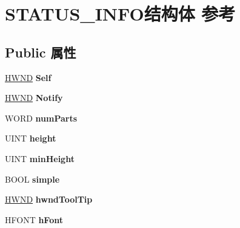 \hypertarget{struct_s_t_a_t_u_s___i_n_f_o}{}\section{S\+T\+A\+T\+U\+S\+\_\+\+I\+N\+F\+O结构体 参考}
\label{struct_s_t_a_t_u_s___i_n_f_o}
\subsection*{Public 属性}
\begin{DoxyCompactItemize}
\item 
\mbox{\label{struct_s_t_a_t_u_s___i_n_f_o_a9377010fe4b0cc39ac764ac36dc15b16}} 
\hyperlink{interfacevoid}{H\+W\+ND} {\bfseries Self}
\item 
\mbox{\label{struct_s_t_a_t_u_s___i_n_f_o_a75aaee95755fa42dd9b2267f68747cea}} 
\hyperlink{interfacevoid}{H\+W\+ND} {\bfseries Notify}
\item 
\mbox{\label{struct_s_t_a_t_u_s___i_n_f_o_a2fa7143087015b799275569ce86ca33b}} 
W\+O\+RD {\bfseries num\+Parts}
\item 
\mbox{\label{struct_s_t_a_t_u_s___i_n_f_o_a105f6a8064d7e94e93b41728990576d4}} 
U\+I\+NT {\bfseries height}
\item 
\mbox{\label{struct_s_t_a_t_u_s___i_n_f_o_a2fcc0da361d205548d32588013e2914c}} 
U\+I\+NT {\bfseries min\+Height}
\item 
\mbox{\label{struct_s_t_a_t_u_s___i_n_f_o_a212707be896c7a43a3914613e6237783}} 
B\+O\+OL {\bfseries simple}
\item 
\mbox{\label{struct_s_t_a_t_u_s___i_n_f_o_ae3da41fb265e0f7a2fa53d0f56b6a985}} 
\hyperlink{interfacevoid}{H\+W\+ND} {\bfseries hwnd\+Tool\+Tip}
\item 
\mbox{\label{struct_s_t_a_t_u_s___i_n_f_o_a0fdf2d2f58daa85bd156e84263cd1461}} 
H\+F\+O\+NT {\bfseries h\+Font}
\item 

\end{DoxyCompactItemize}
